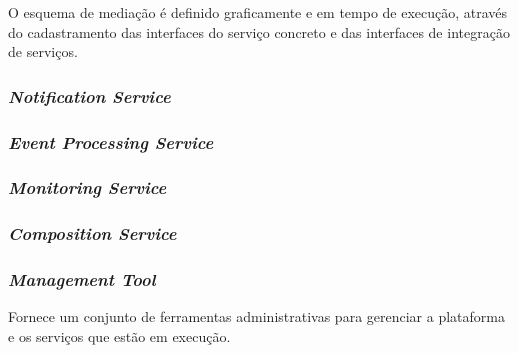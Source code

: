 O esquema de mediação é definido graficamente e em tempo de execução, através do cadastramento das interfaces do serviço concreto e das interfaces de integração de serviços.

\subsubsection{\textit{Notification Service}}

\subsubsection{\textit{Event Processing Service}}
\label{subsec:cep}

\subsubsection{\textit{Monitoring Service}}
\label{subsec:monit_serv}

\subsubsection{\textit{Composition Service}}

\subsubsection{\textit{Management Tool}}
Fornece um conjunto de ferramentas administrativas para gerenciar a plataforma e os serviços que estão em execução.

